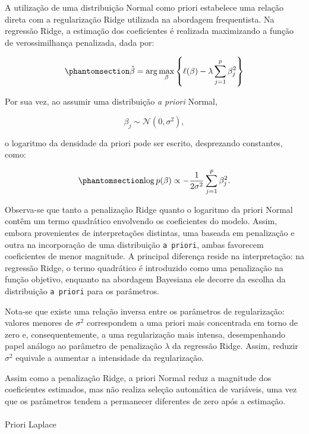 \documentclass[
  brazilian,
  12pt,
  letterpaper,
  DIV=11,
  numbers=noendperiod]{scrartcl}
\makeatletter
\let\oldparagraph\paragraph
\renewcommand{\paragraph}{
    \@ifstar
      \xxxParagraphStar
      \xxxParagraphNoStar
  }
\newcommand{\xxxParagraphStar}[1]{\oldparagraph*{#1}\mbox{}}
\newcommand{\xxxParagraphNoStar}[1]{\oldparagraph{#1}\mbox{}}
\makeatother
\begin{document}
A utilização de uma distribuição Normal como priori estabelece uma
relação direta com a regularização Ridge utilizada na abordagem
frequentista. Na regressão Ridge, a estimação dos coeficientes é
realizada maximizando a função de verossimilhança penalizada, dada por:

\begin{equation}\protect\phantomsection\label{eq-ridge}{
\hat{\beta}
=
\arg\max_{\beta}
\left\{
\ell(\beta)
-
\lambda
\sum_{j=1}^{p}
\beta_j^2
\right\}
}\end{equation}

Por sua vez, ao assumir uma distribuição \emph{a priori} Normal,

\[
\beta_j
\sim
\mathcal{N}
(0,\sigma^2),
\]

o logaritmo da densidade da priori pode ser escrito, desprezando
constantes, como:

\begin{equation}\protect\phantomsection\label{eq-logprior-normal}{
\log p(\beta)
\propto
-
\frac{1}{2\sigma^2}
\sum_{j=1}^{p}
\beta_j^2.
}\end{equation}

Observa-se que tanto a penalização Ridge quanto o logaritmo da priori
Normal contêm um termo quadrático envolvendo os coeficientes do modelo.
Assim, embora provenientes de interpretações distintas, uma baseada em
penalização e outra na incorporação de uma distribuição
\texttt{a\ priori}, ambas favorecem coeficientes de menor magnitude. A
principal diferença reside na interpretação: na regressão Ridge, o termo
quadrático é introduzido como uma penalização na função objetivo,
enquanto na abordagem Bayesiana ele decorre da escolha da distribuição
\texttt{a\ priori} para os parâmetros.

Nota-se que existe uma relação inversa entre os parâmetros de
regularização: valores menores de \(\sigma^2\) correspondem a uma priori
mais concentrada em torno de zero e, consequentemente, a uma
regularização mais intensa, desempenhando papel análogo ao parâmetro de
penalização \(\lambda\) da regressão Ridge. Assim, reduzir \(\sigma^2\)
equivale a aumentar a intensidade da regularização.

Assim como a penalização Ridge, a priori Normal reduz a magnitude dos
coeficientes estimados, mas não realiza seleção automática de variáveis,
uma vez que os parâmetros tendem a permanecer diferentes de zero após a
estimação.

\paragraph{Priori Laplace}\label{priori-laplace}
\end{document}
